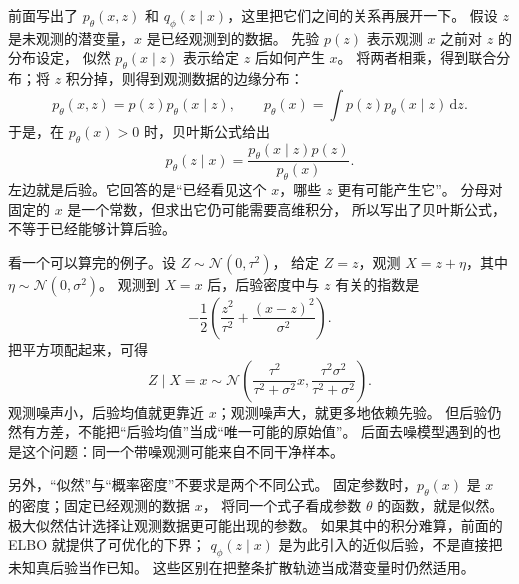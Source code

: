 前面写出了 $p_\theta(x,z)$ 和 $q_\phi(z\mid x)$，这里把它们之间的关系再展开一下。
假设 $z$ 是未观测的潜变量，$x$ 是已经观测到的数据。
先验 $p(z)$ 表示观测 $x$ 之前对 $z$ 的分布设定，
似然 $p_\theta(x\mid z)$ 表示给定 $z$ 后如何产生 $x$。
将两者相乘，得到联合分布；将 $z$ 积分掉，则得到观测数据的边缘分布：
\[
p_\theta(x,z)=p(z)p_\theta(x\mid z),\qquad
p_\theta(x)=\int p(z)p_\theta(x\mid z)\,\mathrm dz.
\]
于是，在 $p_\theta(x)>0$ 时，贝叶斯公式给出
\[
p_\theta(z\mid x)=\frac{p_\theta(x\mid z)p(z)}{p_\theta(x)}.
\]
左边就是后验。它回答的是“已经看见这个 $x$，哪些 $z$ 更有可能产生它”。
分母对固定的 $x$ 是一个常数，但求出它仍可能需要高维积分，
所以写出了贝叶斯公式，不等于已经能够计算后验。

看一个可以算完的例子。设 $Z\sim\mathcal N(0,\tau^2)$，
给定 $Z=z$，观测 $X=z+\eta$，其中 $\eta\sim\mathcal N(0,\sigma^2)$。
观测到 $X=x$ 后，后验密度中与 $z$ 有关的指数是
\[
-\frac12\left(\frac{z^2}{\tau^2}+\frac{(x-z)^2}{\sigma^2}\right).
\]
把平方项配起来，可得
\[
Z\mid X=x\sim\mathcal N\left(
\frac{\tau^2}{\tau^2+\sigma^2}x,
\frac{\tau^2\sigma^2}{\tau^2+\sigma^2}\right).
\]
观测噪声小，后验均值就更靠近 $x$；观测噪声大，就更多地依赖先验。
但后验仍然有方差，不能把“后验均值”当成“唯一可能的原始值”。
后面去噪模型遇到的也是这个问题：同一个带噪观测可能来自不同干净样本。

另外，“似然”与“概率密度”不要求是两个不同公式。
固定参数时，$p_\theta(x)$ 是 $x$ 的密度；固定已经观测的数据 $x$，
将同一个式子看成参数 $\theta$ 的函数，就是似然。
极大似然估计选择让观测数据更可能出现的参数。
如果其中的积分难算，前面的 ELBO 就提供了可优化的下界；
$q_\phi(z\mid x)$ 是为此引入的近似后验，不是直接把未知真后验当作已知。
这些区别在把整条扩散轨迹当成潜变量时仍然适用。\cite{theorybook}
